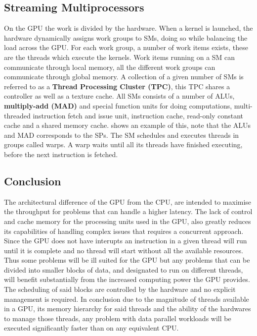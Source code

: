 \subsection{Streaming Multiprocessors}
On the GPU the work is divided by the hardware.
When a kernel is launched, the hardware dynamically assigns work groups to SMs, doing so while balancing the load across the GPU.
For each work group, a number of work items exists, these are the threads which execute the kernels.
Work items running on a SM can communicate through local memory, all the different work groups can communicate through global memory. %
A collection of a given number of SMs is referred to as a \textbf{Thread Processing Cluster (TPC)}, this TPC shares a controller as well as a texture cache.
All SMs consists of a number of ALUs, \textbf{multiply-add (MAD)} and special function units for doing computations, multi-threaded instruction fetch and issue unit, instruction cache, read-only constant cache and a shared memory cache.
 shows an example of this, note that the ALUs and MAD corresponds to the SPs.
The SM schedules and executes threads in groups called warps.
A warp waits until all its threads have finished executing, before the next instruction is fetched. 


\subsection{Conclusion} %

The architectural difference of the GPU from the CPU, are intended to maximise the throughput for problems that can handle a higher latency.
The lack of control and cache memory for the processing units used in the GPU, also greatly reduces its capabilities of handling complex issues that requires a concurrent approach.
Since the GPU does not have interupts an instruction in a given thread will run until it is complete and no thread will start without all the available resources.
Thus some problems will be ill suited for the GPU but any problems that can be divided into smaller blocks of data, and designated to run on different threads, will benefit substantially from the increased computing power the GPU provides.
The scheduling of said blocks are controlled by the hardware and no explicit management is required.
In conclusion due to the magnitude of threads available in a GPU, its memory hierarchy for said threads and the ability of the hardwares to manage those threads, any problem with data parallel workloads will be executed significantly faster than on any equivalent CPU.

